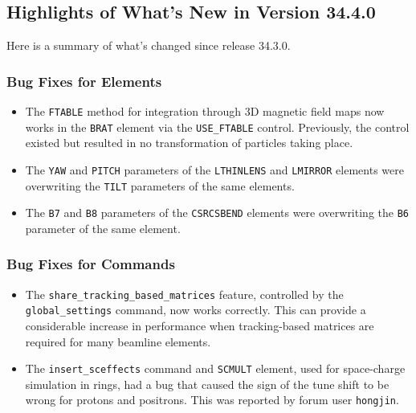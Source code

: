 \documentclass[11pt]{article}
\begin{document}
\subsection{Highlights of What's New in Version 34.4.0}

Here is a summary of what's changed since release 34.3.0.

\subsubsection{Bug Fixes for Elements}

\begin{itemize}
\item The \verb|FTABLE| method for integration through 3D magnetic field maps now works in the \verb|BRAT|
  element via the \verb|USE_FTABLE| control. Previously, the control existed but resulted in no transformation
  of particles taking place.
\item The \verb|YAW| and \verb|PITCH| parameters of the \verb|LTHINLENS| and \verb|LMIRROR| elements were overwriting
  the \verb|TILT| parameters of the same elements. 
\item The \verb|B7| and \verb|B8| parameters of the \verb|CSRCSBEND| elements were overwriting the \verb|B6| parameter
  of the same element.
\end{itemize}

\subsubsection{Bug Fixes for Commands}
\begin{itemize}
\item The \verb|share_tracking_based_matrices| feature, controlled by the \verb|global_settings| command, now
  works correctly. This can provide a considerable increase in performance when tracking-based matrices are
  required for many beamline elements.
\item The \verb|insert_sceffects| command  and \verb|SCMULT| element, used for space-charge simulation in rings,
  had a bug that caused the sign of the tune shift to be wrong for protons and positrons. This was reported by
  forum user \verb|hongjin|.
\end{itemize}
\end{document}
